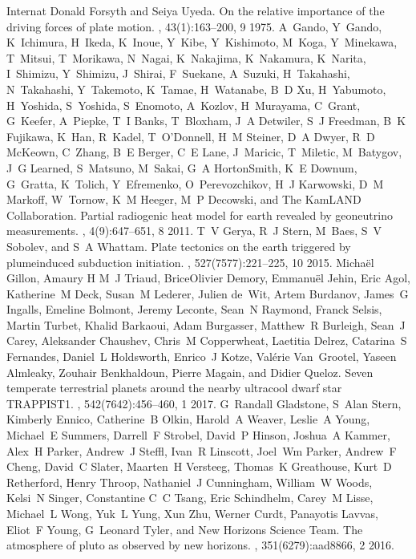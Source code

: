 \documentclass[letterpaper,10pt,english]{jupyterBook}
\begin{document}
\begin{sphinxthebibliography}{Internat}
Donald Forsyth and Seiya Uyeda. On the relative importance of the driving forces of plate motion. , 43(1):163–200, 9 1975.
\sphinxAtStartPar
A Gando, Y Gando, K Ichimura, H Ikeda, K Inoue, Y Kibe, Y Kishimoto, M Koga, Y Minekawa, T Mitsui, T Morikawa, N Nagai, K Nakajima, K Nakamura, K Narita, I Shimizu, Y Shimizu, J Shirai, F Suekane, A Suzuki, H Takahashi, N Takahashi, Y Takemoto, K Tamae, H Watanabe, B D Xu, H Yabumoto, H Yoshida, S Yoshida, S Enomoto, A Kozlov, H Murayama, C Grant, G Keefer, A Piepke, T I Banks, T Bloxham, J A Detwiler, S J Freedman, B K Fujikawa, K Han, R Kadel, T O'Donnell, H M Steiner, D A Dwyer, R D McKeown, C Zhang, B E Berger, C E Lane, J Maricic, T Miletic, M Batygov, J G Learned, S Matsuno, M Sakai, G A Horton\sphinxhyphen{}Smith, K E Downum, G Gratta, K Tolich, Y Efremenko, O Perevozchikov, H J Karwowski, D M Markoff, W Tornow, K M Heeger, M P Decowski, and The KamLAND Collaboration. Partial radiogenic heat model for earth revealed by geoneutrino measurements. , 4(9):647–651, 8 2011.
\sphinxAtStartPar
T V Gerya, R J Stern, M Baes, S V Sobolev, and S A Whattam. Plate tectonics on the earth triggered by plume\sphinxhyphen{}induced subduction initiation. , 527(7577):221–225, 10 2015.
\sphinxAtStartPar
Michaël Gillon, Amaury H M J Triaud, Brice\sphinxhyphen{}Olivier Demory, Emmanuël Jehin, Eric Agol, Katherine M Deck, Susan M Lederer, Julien de Wit, Artem Burdanov, James G Ingalls, Emeline Bolmont, Jeremy Leconte, Sean N Raymond, Franck Selsis, Martin Turbet, Khalid Barkaoui, Adam Burgasser, Matthew R Burleigh, Sean J Carey, Aleksander Chaushev, Chris M Copperwheat, Laetitia Delrez, Catarina S Fernandes, Daniel L Holdsworth, Enrico J Kotze, Valérie Van Grootel, Yaseen Almleaky, Zouhair Benkhaldoun, Pierre Magain, and Didier Queloz. Seven temperate terrestrial planets around the nearby ultracool dwarf star TRAPPIST\sphinxhyphen{}1. , 542(7642):456–460, 1 2017.
\sphinxAtStartPar
G Randall Gladstone, S Alan Stern, Kimberly Ennico, Catherine B Olkin, Harold A Weaver, Leslie A Young, Michael E Summers, Darrell F Strobel, David P Hinson, Joshua A Kammer, Alex H Parker, Andrew J Steffl, Ivan R Linscott, Joel Wm Parker, Andrew F Cheng, David C Slater, Maarten H Versteeg, Thomas K Greathouse, Kurt D Retherford, Henry Throop, Nathaniel J Cunningham, William W Woods, Kelsi N Singer, Constantine C C Tsang, Eric Schindhelm, Carey M Lisse, Michael L Wong, Yuk L Yung, Xun Zhu, Werner Curdt, Panayotis Lavvas, Eliot F Young, G Leonard Tyler, and New Horizons Science Team. The atmosphere of pluto as observed by new horizons. , 351(6279):aad8866, 2 2016.

\end{sphinxthebibliography}
\end{document}
